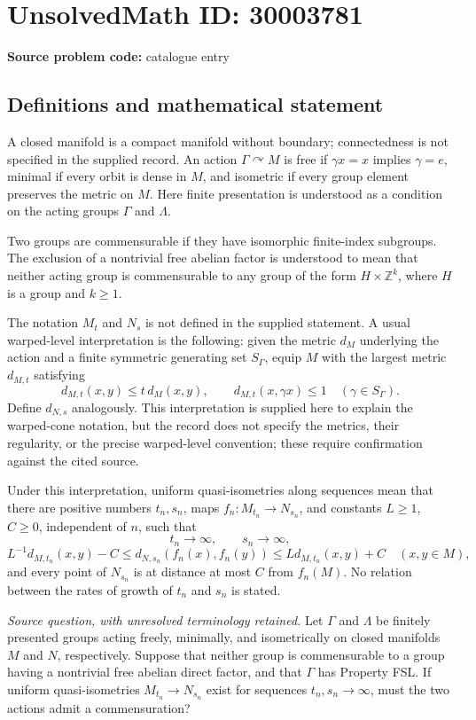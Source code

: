 \documentclass[11pt]{article}
\newcommand{\Z}{\mathbb{Z}}
\begin{document}
\section*{UnsolvedMath ID: 30003781}
\textbf{Source problem code:} catalogue entry
\subsection{Definitions and mathematical statement}
A closed manifold is a compact manifold without boundary; connectedness is not specified in the supplied record. An action \(\Gamma\curvearrowright M\) is free if \(\gamma x=x\) implies \(\gamma=e\), minimal if every orbit is dense in \(M\), and isometric if every group element preserves the metric on \(M\). Here finite presentation is understood as a condition on the acting groups \(\Gamma\) and \(\Lambda\).

Two groups are commensurable if they have isomorphic finite-index subgroups. The exclusion of a nontrivial free abelian factor is understood to mean that neither acting group is commensurable to any group of the form \(H\times\Z^k\), where \(H\) is a group and \(k\geq1\).

The notation \(M_t\) and \(N_s\) is not defined in the supplied statement. A usual warped-level interpretation is the following: given the metric \(d_M\) underlying the action and a finite symmetric generating set \(S_\Gamma\), equip \(M\) with the largest metric \(d_{M,t}\) satisfying
\[
 d_{M,t}(x,y)\leq t\,d_M(x,y),\qquad
 d_{M,t}(x,\gamma x)\leq1
 \quad(\gamma\in S_\Gamma).
\]
Define \(d_{N,s}\) analogously. This interpretation is supplied here to explain the warped-cone notation, but the record does not specify the metrics, their regularity, or the precise warped-level convention; these require confirmation against the cited source.

Under this interpretation, uniform quasi-isometries along sequences mean that there are positive numbers \(t_n,s_n\), maps \(f_n:M_{t_n}\to N_{s_n}\), and constants \(L\geq1\), \(C\geq0\), independent of \(n\), such that
\[
 t_n\longrightarrow\infty,\qquad s_n\longrightarrow\infty,
\]
\[
 L^{-1}d_{M,t_n}(x,y)-C
 \leq d_{N,s_n}(f_n(x),f_n(y))
 \leq Ld_{M,t_n}(x,y)+C
 \quad(x,y\in M),
\]
and every point of \(N_{s_n}\) is at distance at most \(C\) from \(f_n(M)\). No relation between the rates of growth of \(t_n\) and \(s_n\) is stated.

\emph{Source question, with unresolved terminology retained.} Let \(\Gamma\) and \(\Lambda\) be finitely presented groups acting freely, minimally, and isometrically on closed manifolds \(M\) and \(N\), respectively. Suppose that neither group is commensurable to a group having a nontrivial free abelian direct factor, and that \(\Gamma\) has Property FSL. If uniform quasi-isometries \(M_{t_n}\to N_{s_n}\) exist for sequences \(t_n,s_n\to\infty\), must the two actions admit a commensuration?
\end{document}
